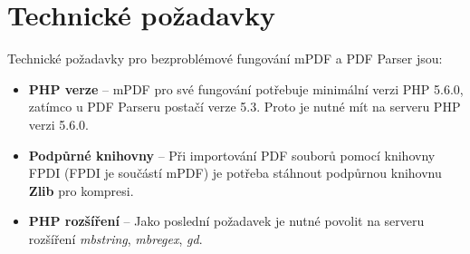 \section{Technické požadavky}
Technické požadavky pro bezproblémové fungování mPDF a PDF Parser jsou:
\begin{itemize} 
	\item \textbf{PHP verze} -- mPDF pro své fungování potřebuje minimální verzi PHP 5.6.0, zatímco u PDF Parseru postačí verze 5.3. Proto je nutné mít na serveru PHP verzi 5.6.0.
	\item \textbf{Podpůrné knihovny} -- Při importování PDF souborů pomocí knihovny FPDI (FPDI je součástí mPDF) je potřeba stáhnout podpůrnou knihovnu \textbf{Zlib} pro kompresi.
	\item \textbf{PHP rozšíření} -- Jako poslední požadavek je nutné povolit na serveru rozšíření \textit{mbstring}, \textit{mbregex}, \textit{gd}.
\end{itemize}
